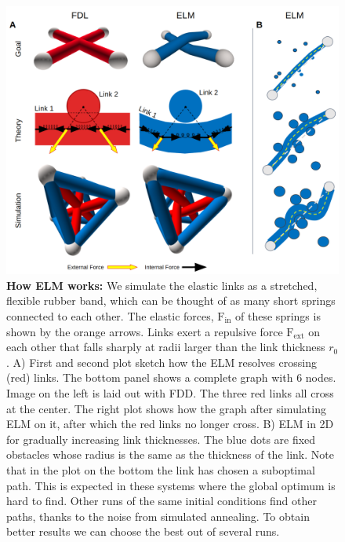 \documentclass[nofootinbib,preprint,endfloats]{revtex4} %
\begin{document}
\begin{figure}
    \centering
    \includegraphics[width = .8\columnwidth]{fig-09-19/elf-resolve-2d.png}%
    \caption{{\bf How ELM works:} We simulate the elastic links as a stretched, flexible rubber band, which can be thought of as many short springs connected to each other. The elastic forces, $\mathrm{F}_{\mathrm{in}}$ of these springs is shown by the orange arrows. Links exert a repulsive force $\mathrm{F}_{\mathrm{ext}}$  on each other that falls sharply at radii larger than the link thickness $r_0$. 
    A) First and second plot sketch how the ELM resolves crossing (red) links. The bottom panel shows a complete graph with 6 nodes. Image on the left is laid out with FDD. The three red links all cross at the center. The right plot shows how the graph after simulating ELM on it, after which the red links no longer cross. B) ELM in 2D for gradually increasing link thicknesses. The blue dots are fixed obstacles whose radius is the same as the thickness of the link. Note that in the plot on the bottom the link has chosen a suboptimal path. This is  expected in these systems where the global optimum is hard to find. Other runs of the same initial conditions find other paths, thanks to the noise from simulated annealing. To obtain better results we can choose the best out of several runs.}
    \label{fig:resolve}
\end{figure}
%
\end{document}
